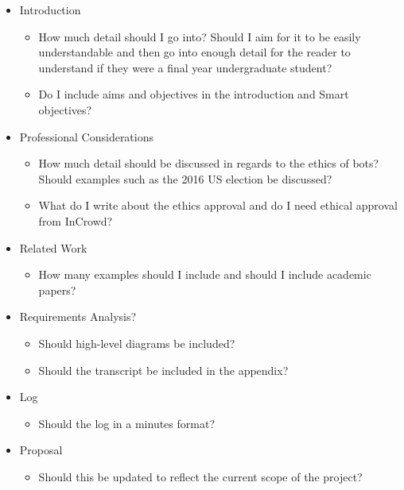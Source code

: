 \documentclass[chapterprefix=false]{scrreprt}
\begin{document}
\begin{itemize} 
  \setlength\itemsep{-0.75em}
  \item Introduction
  \begin{itemize}
     \setlength\itemsep{-0.75em}
     \item  How much detail should I go into? Should I aim for it to be easily understandable and then go into enough detail for the reader to understand if they were a final year undergraduate student? 
     \item Do I include aims and objectives in the introduction and Smart objectives?
  \end{itemize}
  \item Professional Considerations
    \begin{itemize}
     \setlength\itemsep{-0.75em}
     \item How much detail should be discussed in regards to the ethics of bots?
     Should examples such as the 2016 US election be discussed?
     \item What do I write about the ethics approval and do I need ethical approval from InCrowd?
    \end{itemize}
  \item Related Work
    \begin{itemize}
     \setlength\itemsep{-0.75em}
     \item How many examples should I include and should I include academic papers?
    \end{itemize}
  \item Requirements Analysis?
    \begin{itemize}
     \setlength\itemsep{-0.75em}
     \item Should high-level diagrams be included?
     \item Should the transcript be included in the appendix?
    \end{itemize}
  \item Log
    \begin{itemize}
     \setlength\itemsep{-0.75em}
     \item Should the log in a minutes format?
    \end{itemize}
  \item Proposal
    \begin{itemize}
     \setlength\itemsep{-0.75em}
     \item Should this be updated to reflect the current scope of the project?
    \end{itemize}
\end{itemize}
\end{document}
